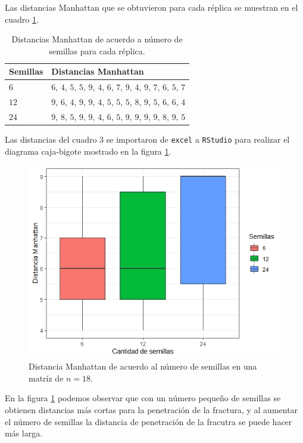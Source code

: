 \documentclass{article}
\begin{document}
Las distancias Manhattan que se obtuvieron para cada réplica se muestran en el cuadro \ref{Cuadro 3}.

\begin{table}[ht]
\centering
\caption{Distancias Manhattan de acuerdo a número de semillas para cada réplica.}
\smallskip

 \begin{tabular}{|p{1.5cm}|p{5.5cm}|}
 \hline
 Semillas & Distancias Manhattan \\ \hline
 $6$ & $6$, $4$, $5$, $5$, $9$, $4$, $6$, $7$, $9$, $4$, $9$, $7$, $6$, $5$, $7$
 \\ \hline
 $12$ & $9$, $6$, $4$, $9$, $9$, $4$, $5$, $5$, $5$, $8$, $9$, $5$, $6$, $6$, $4$
 \\ \hline
 $24$ & $9$, $8$, $5$, $9$, $9$, $4$, $6$, $5$, $9$, $9$, $9$, $9$, $8$, $9$, $5$
\\ \hline
\end{tabular}
\label{Cuadro 3}
\end{table}
\bigskip

Las distancias del cuadro 3 se importaron de \texttt{excel} a \texttt{RStudio} para realizar el diagrama caja-bigote mostrado en la figura \ref{Figura 1}.

\begin{figure} [h!]%
    \centering
    \includegraphics[width=130mm]{Figura1.jpeg} %
    \caption{Distancia Manhattan de acuerdo al número de semillas en una matríz de $n = 18$.}
    \label{Figura 1}
\end{figure}

En la figura \ref{Figura 1} podemos observar que con un número pequeño de semillas se obtienen distancias más cortas para la penetración de la fractura, y al aumentar el número de semillas la distancia de penetración de la fracutra se puede hacer más larga.
\end{document}
